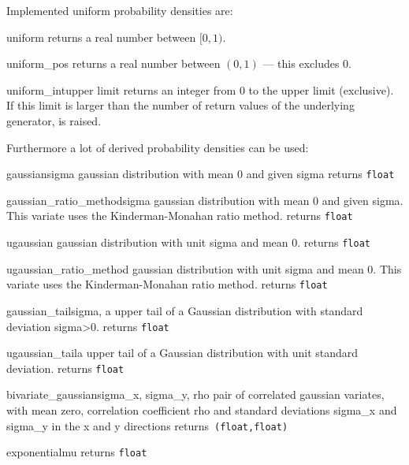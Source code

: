 Implemented uniform probability densities are:
\begin{methoddesc}{uniform}{}
returns a real number between $[0,1)$.
\end{methoddesc}
\begin{methoddesc}{uniform_pos}{}
returns a real number between $(0,1)$ --- this excludes 0.
\end{methoddesc}
\begin{methoddesc}{uniform_int}{upper limit}
returns an integer from 0 to the upper limit (exclusive). If this limit is larger than the
number of return values of the underlying generator,  is raised.
\end{methoddesc}
Furthermore a lot of derived probability densities can be used:
\begin{methoddesc}{gaussian}{sigma}
gaussian distribution with mean 0 and given sigma
\hfill returns {\tt float}
\end{methoddesc}
\begin{methoddesc}{gaussian\_ratio\_method}{sigma}
gaussian distribution with mean 0 and given sigma.
This variate uses the Kinderman-Monahan ratio method.
\hfill returns {\tt float}
\end{methoddesc}
\begin{methoddesc}{ugaussian}{}
gaussian distribution with unit sigma and mean 0.
\hfill returns {\tt float}
\end{methoddesc}
\begin{methoddesc}{ugaussian\_ratio\_method}{}
gaussian distribution with unit sigma and mean 0.
This variate uses the Kinderman-Monahan ratio method.
\hfill returns {\tt float}
\end{methoddesc}
\begin{methoddesc}{gaussian\_tail}{sigma, a}
 upper tail of a Gaussian distribution with standard deviation sigma>0.
\hfill returns {\tt float}
\end{methoddesc}
\begin{methoddesc}{ugaussian\_tail}{a}
 upper tail of a Gaussian distribution with unit standard deviation.
\hfill returns {\tt float}
\end{methoddesc}
\begin{methoddesc}{bivariate\_gaussian}{sigma\_x, sigma\_y, rho}
pair of correlated gaussian variates, with mean zero, correlation coefficient rho and standard deviations sigma\_x and sigma\_y in the x and y directions
\hfill returns~{\tt (float,float)}
\end{methoddesc}
\begin{methoddesc}{exponential}{mu}
\hfill returns {\tt float}
\end{methoddesc}
